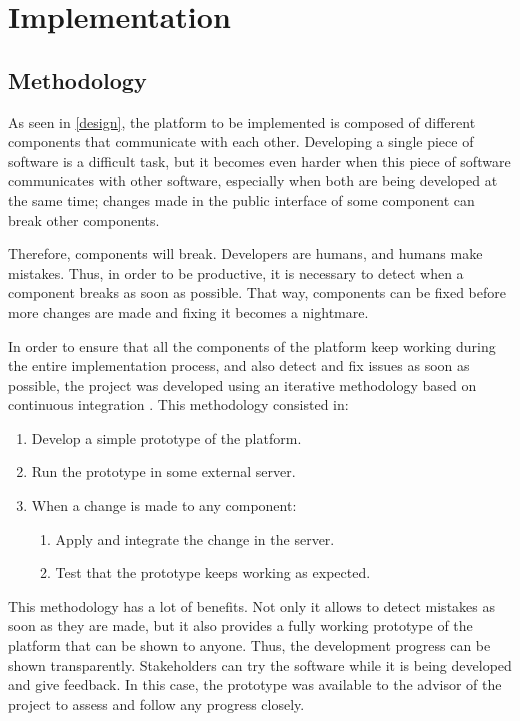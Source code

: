 \documentclass[a4paper,11pt,titlepage,abstract,numbers=noenddot,automark,mnsy,intlimits,rgb,dvipsnames]{report}
\begin{document}
\part{Implementation}
\chapter{Methodology}
\label{methodology}
As seen in \autoref{design}, the platform to be implemented is composed of different components that communicate with
each other. Developing a single piece of software is a difficult task, but it becomes even harder when this piece of software
communicates with other software, especially when both are being developed at the same time; changes made in
the public interface of some component can break other components.

Therefore, components will break. Developers are humans, and humans make mistakes. Thus, in order to be productive,
it is necessary to detect when a component breaks as soon as possible. That way, components can be fixed before more changes
are made and fixing it becomes a nightmare.

In order to ensure that all the components of the platform keep working during the entire implementation process, and also
detect and fix issues as soon as possible, the project was developed using an iterative methodology based on
continuous integration \cite{ci}. This methodology consisted in:
\begin{enumerate}
\item
Develop a simple prototype of the platform.
\item
Run the prototype in some external server.
\item
When a change is made to any component:
\begin{enumerate}
\item
Apply and integrate the change in the server.
\item
Test that the prototype keeps working as expected.
\end{enumerate}
\end{enumerate}
This methodology has a lot of benefits. Not only it allows to detect mistakes as soon as they are made, but it also provides
a fully working prototype of the platform that can be shown to anyone. Thus, the development progress can be shown
transparently. Stakeholders can try the software while it is being developed and give feedback. In this case,
the prototype was available to the advisor of the project to assess and follow any progress closely.
\end{document}
